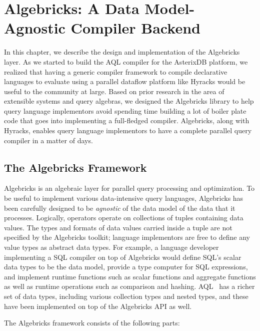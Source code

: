 \chapter{Algebricks: A Data Model-Agnostic Compiler Backend}
\label{ch:algebricks}

In this chapter, we describe the design and implementation of the Algebricks layer. As we started to build the AQL compiler for the AsterixDB platform, we realized that having a generic compiler framework to compile declarative languages to evaluate using a parallel dataflow platform like Hyracks would be useful to the community at large. Based on prior research in the area of extensible systems and query algebras, we designed the Algebricks library to help query language implementors avoid spending time building a lot of boiler plate code that goes into implementing a full-fledged compiler. Algebricks, along with Hyracks, enables query language implementors to have a complete parallel query compiler in a matter of days.


\section{The Algebricks Framework}\label{sec:algebricks-fw}

Algebricks is an 
algebraic layer for parallel query
processing and optimization.
To be useful to implement various data-intensive query languages,
Algebricks has been carefully designed to be {\em agnostic} of the data model of the data that it processes. 
Logically, operators operate on collections of tuples containing data values. 
The types and formats of data values carried inside a tuple are not specified by the Algebricks toolkit; language implementors are free to define any value types as abstract data types. 
For example, a language developer implementing a SQL compiler on top of Algebricks would define SQL's scalar data types to be the data model, provide a type computer for SQL expressions, and implement runtime functions such as scalar functions and aggregate functions as well as runtime operations such as comparison and hashing. 
AQL~\cite{ASTERIX} has a richer set of data types, including various collection types and nested types, and these have been implemented on top of the Algebricks API
as well.

The Algebricks framework consists of the following parts:

